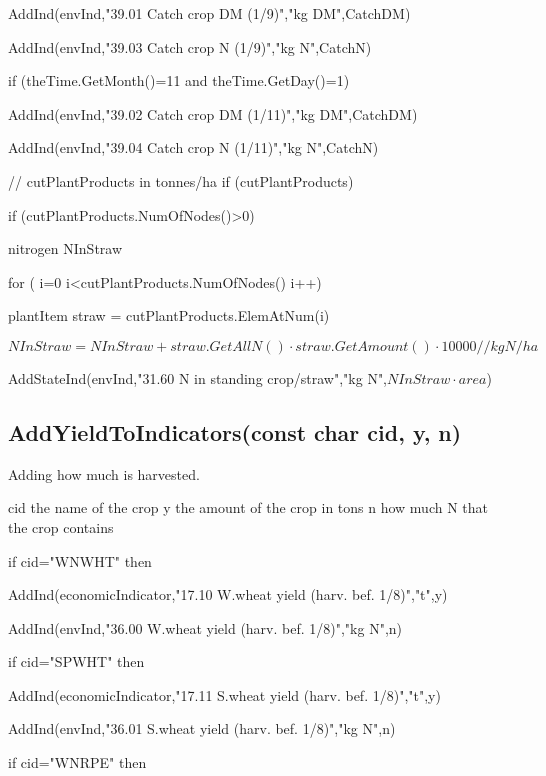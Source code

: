 \documentclass[%
]{scrartcl}
\begin{document}
{{{    \quad  
   		 AddInd(envInd,"39.01 Catch crop DM (1/9)","kg DM",CatchDM)
	
\quad  		 AddInd(envInd,"39.03 Catch crop N (1/9)","kg N",CatchN)
      
      if (theTime.GetMonth()=11  and  theTime.GetDay()=1)
      
	\quad  		 AddInd(envInd,"39.02 Catch crop DM (1/11)","kg DM",CatchDM)
	
 \quad  		 AddInd(envInd,"39.04 Catch crop N (1/11)","kg N",CatchN)
      
   

   // cutPlantProducts in tonnes/ha
	if (cutPlantProducts)
   
      if (cutPlantProducts.NumOfNodes()>0)
      
        \quad   nitrogen NInStraw
        
\quad   for ( i=0 i<cutPlantProducts.NumOfNodes() i++)
         

         \quad    \quad   plantItem straw = cutPlantProducts.ElemAtNum(i)
     
   \quad    \quad    $NInStraw = NInStraw + straw.GetAllN() \cdot straw.GetAmount() \cdot 10000 // kg N/ha$
         
       \quad   AddStateInd(envInd,"31.60 N in standing crop/straw","kg N",$NInStraw \cdot area$)
      
   



\subsection{AddYieldToIndicators(const char  cid,   y,  n)}

   Adding how much is harvested.

 cid the name of the crop
y the amount of the crop in tons
  n how much N that the crop contains


   if cid="WNWHT"  then 

	\quad	 AddInd(economicIndicator,"17.10 W.wheat yield (harv. bef. 1/8)","t",y)
   	 
\quad AddInd(envInd,"36.00 W.wheat yield (harv. bef. 1/8)","kg N",n)
  
   if cid="SPWHT" then
 	
   \quad 	AddInd(economicIndicator,"17.11 S.wheat yield (harv. bef. 1/8)","t",y)
   	
 \quad AddInd(envInd,"36.01 S.wheat yield (harv. bef. 1/8)","kg N",n)
  
   if cid="WNRPE" then 
	
}}}
\end{document}
